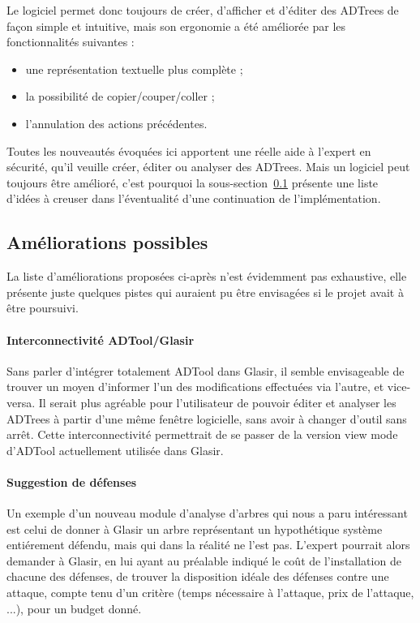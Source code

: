 Le logiciel permet donc toujours de créer, d'afficher et d'éditer des ADTrees de façon simple et intuitive, mais son ergonomie a été améliorée par les fonctionnalités suivantes :
\begin{itemize}
	\item une représentation textuelle plus complète ;
	\item la possibilité de copier/couper/coller ;
	\item l'annulation des actions précédentes.
\end{itemize}

Toutes les nouveautés évoquées ici apportent une réelle aide à l'expert en sécurité, qu'il veuille créer, éditer ou analyser des ADTrees. Mais un logiciel peut toujours être amélioré, c'est pourquoi la {\sc sous-section}~\ref{subsec:encorePlusMieux} présente une liste d'idées à creuser dans l'éventualité d'une continuation de l'implémentation.

\subsection{Améliorations possibles}
\label{subsec:encorePlusMieux}

La liste d'améliorations proposées ci-après n'est évidemment pas exhaustive, elle présente juste quelques pistes qui auraient pu être envisagées si le projet avait à être poursuivi.

\paragraph{Interconnectivité ADTool/Glasir} Sans parler d'intégrer totalement ADTool dans Glasir, il semble envisageable de trouver un moyen d'informer l'un des modifications effectuées via l'autre, et vice-versa. Il serait plus agréable pour l'utilisateur de pouvoir éditer et analyser les ADTrees à partir d'une même fenêtre logicielle, sans avoir à changer d'outil sans arrêt. Cette interconnectivité permettrait de se passer de la version \og view mode \fg{} d'ADTool actuellement utilisée dans Glasir. 

\paragraph{Suggestion de défenses} Un exemple d'un nouveau module d'analyse d'arbres qui nous a paru intéressant est celui de donner à Glasir un arbre représentant un hypothétique système entiérement défendu, mais qui dans la réalité ne l'est pas. L'expert pourrait alors demander à Glasir, en lui ayant au préalable indiqué le coût de l'installation de chacune des défenses, de trouver la disposition idéale des défenses contre une attaque, compte tenu d'un critère (temps nécessaire à l'attaque, prix de l'attaque, ...), pour un budget donné. 
